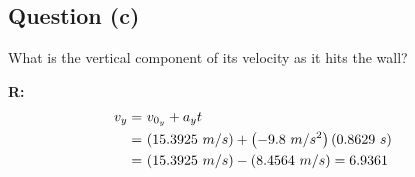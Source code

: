 	\subsection{Question (c)}
		What is the vertical component of its velocity as it hits the wall?

		\textbf{R:} \newline
		\begin{align}
			v_{y} = \ &v_{0_{y}} + a_{y}t& \notag \\
			= \ &(15.3925 \ m/s) + \left( -9.8 \ m/s^{2} \right)(0.8629 \ s)& \notag \\
			= \ &(15.3925 \ m/s) - (8.4564 \ m/s) = 6.9361&
		\end{align}
